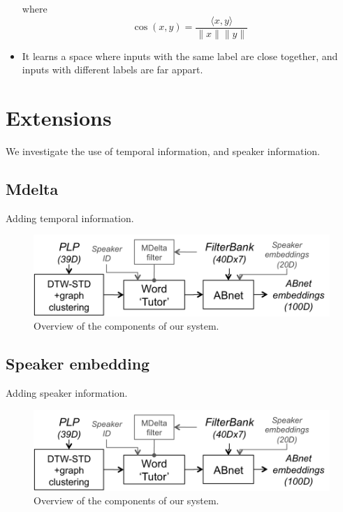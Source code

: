 \documentclass[final]{beamer}
\newcommand{\norm}[1]{\lVert#1\rVert}
\newcommand{\tup}[1]{\langle#1\rangle}
\begin{document}
\begin{frame}[t]
\begin{multicols}{3}
\begin{itemize}
\noindent        
where $$\cos(x, y) = \frac{\tup{x, y}}{\norm{x}\norm{y}}$$

\item It learns a space where inputs with the same label are close together, and inputs with different labels are far appart. 
\end{itemize}


\section*{Extensions}

We investigate the use of temporal information, and speaker information.

\subsection{Mdelta}

Adding temporal information.


\begin{figure}[ht!]
  \begin{center}
    \includegraphics[width=0.85\columnwidth]{System2.png}
    \caption{\label{fig:system}Overview of the components of our system.}
  \end{center}
\end{figure}

\subsection*{Speaker embedding}

Adding speaker information.


\begin{figure}[ht!]
  \begin{center}
    \includegraphics[width=\columnwidth]{System2.png}
    \caption{\label{fig:system}Overview of the components of our system.}
  \end{center}
\end{figure}



\end{multicols}
\end{frame}
\end{document}
